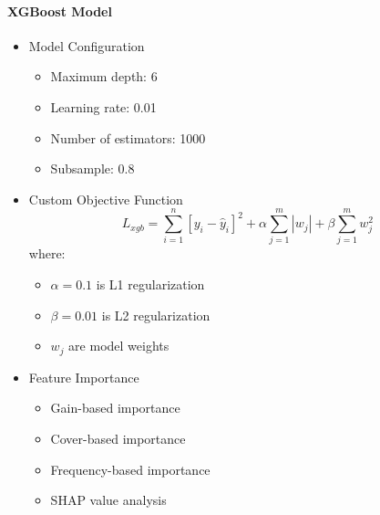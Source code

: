 \documentclass[conference]{IEEEtran}
\begin{document}
\paragraph{XGBoost Model}
\begin{itemize}
    \item Model Configuration
    \begin{itemize}
        \item Maximum depth: 6
        \item Learning rate: 0.01
        \item Number of estimators: 1000
        \item Subsample: 0.8
    \end{itemize}
    
    \item Custom Objective Function
    \begin{equation}
    L_{xgb} = \sum_{i=1}^n [y_i - \hat{y}_i]^2 + \alpha \sum_{j=1}^m |w_j| + \beta \sum_{j=1}^m w_j^2
    \end{equation}
    where:
    \begin{itemize}
        \item $\alpha = 0.1$ is L1 regularization
        \item $\beta = 0.01$ is L2 regularization
        \item $w_j$ are model weights
    \end{itemize}
    
    \item Feature Importance
    \begin{itemize}
        \item Gain-based importance
        \item Cover-based importance
        \item Frequency-based importance
        \item SHAP value analysis
    \end{itemize}
\end{itemize}
\end{document}

